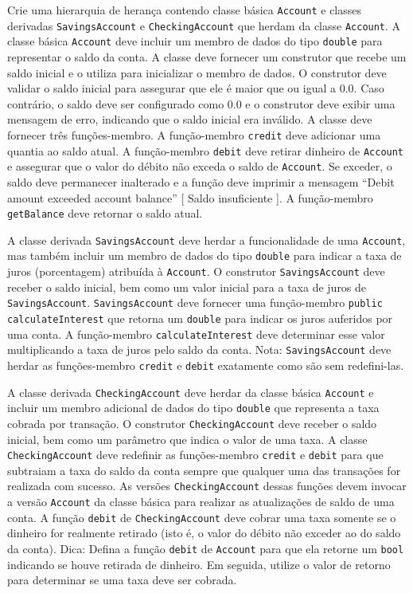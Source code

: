 \documentclass[fleqn]{article}
\begin{document}
\begin{enumerate}
{    Crie uma hierarquia de herança contendo classe básica \texttt{Account} e classes derivadas \texttt{SavingsAccount} e \texttt{CheckingAccount} que herdam da classe \texttt{Account}. A classe básica \texttt{Account} deve incluir um membro de dados do tipo \texttt{double} para representar o saldo da conta. A classe deve fornecer um construtor que recebe um saldo inicial e o utiliza para inicializar o membro de dados. O construtor deve validar o saldo inicial para assegurar que ele é maior que ou igual a $0.0$. Caso contrário, o saldo deve ser configurado como $0.0$ e o construtor deve exibir uma mensagem de erro, indicando que o saldo inicial era inválido. A classe deve fornecer três funções-membro. A função-membro \texttt{credit} deve adicionar uma quantia ao saldo atual. A função-membro \texttt{debit} deve retirar dinheiro de \texttt{Account} e assegurar que o valor do débito não exceda o saldo de \texttt{Account}. Se exceder, o saldo deve permanecer inalterado e a função deve imprimir a mensagem ``Debit amount exceeded account balance'' [ Saldo insuficiente ]. A função-membro \texttt{getBalance} deve retornar o saldo atual.

    A classe derivada \texttt{SavingsAccount} deve herdar a funcionalidade de uma \texttt{Account}, mas também incluir um membro de dados do tipo \texttt{double} para indicar a taxa de juros (porcentagem) atribuída à \texttt{Account}. O construtor \texttt{SavingsAccount} deve receber o saldo inicial, bem como um valor inicial para a taxa de juros de \texttt{SavingsAccount}. \texttt{SavingsAccount} deve fornecer uma função-membro \texttt{public calculateInterest} que retorna um \texttt{double} para indicar os juros auferidos por uma conta. A função-membro \texttt{calculateInterest} deve determinar esse valor multiplicando a taxa de juros pelo saldo da conta. Nota: \texttt{SavingsAccount} deve herdar as funções-membro \texttt{credit} e \texttt{debit} exatamente como são sem redefini-las.

    A classe derivada \texttt{CheckingAccount} deve herdar da classe básica \texttt{Account} e incluir um membro adicional de dados do tipo \texttt{double} que representa a taxa cobrada por transação. O construtor \texttt{CheckingAccount} deve receber o saldo inicial, bem como um parâmetro que indica o valor de uma taxa. A classe \texttt{CheckingAccount} deve redefinir as funções-membro \texttt{credit} e \texttt{debit} para que subtraiam a taxa do saldo da conta sempre que qualquer uma das transações for realizada com sucesso. As versões \texttt{CheckingAccount} dessas funções devem invocar a versão \texttt{Account} da classe básica para realizar as atualizações de saldo de uma conta. A função \texttt{debit} de \texttt{CheckingAccount} deve cobrar uma taxa somente se o dinheiro for realmente retirado (isto é, o valor do débito não exceder ao do saldo da conta). Dica: Defina a função \texttt{debit} de \texttt{Account} para que ela retorne um \texttt{bool} indicando se houve retirada de dinheiro. Em seguida, utilize o valor de retorno para determinar se uma taxa deve ser cobrada.

}
\end{enumerate}
\end{document}
